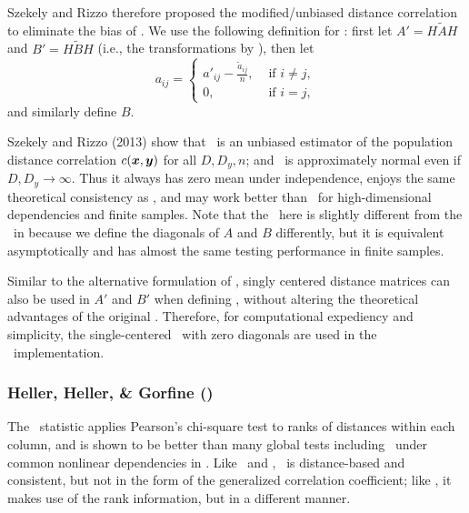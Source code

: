 \documentclass[11pt]{article}
\begin{document}
Szekely and  Rizzo \cite{SzekelyRizzo2013a, SzekelyRizzo2014, RizzoSzekely2016} therefore proposed the modified/unbiased distance correlation  to eliminate the bias of  \Dcorr. We use the following definition for \Mcorr: first let $A'=H\tilde{A}H$ and $B'=H\tilde{B}H$ (i.e., the transformations by  \Dcorr), then let 
\[a_{ij} = \left\{
  \begin{array}{lr}
    a'_{ij}-\frac{\tilde{a}_{ij}}{n}, & \mbox{ if } i \neq j, \\
    0, &\mbox{ if } i = j,
  \end{array}
\right.
\]
and similarly define $B$. 

Szekely and Rizzo (2013) \cite{SzekelyRizzo2013a} show that 
\Mcorr~is an unbiased estimator of the population distance correlation $c(\boldsymbol{x},\boldsymbol{y})$ for all $D, D_y, n$; and \Mcorr~is approximately normal even if $D,D_y \rightarrow \infty$. Thus it always has zero mean under independence, enjoys the same theoretical consistency as \Dcorr, and may work better than \Dcorr~for high-dimensional dependencies and finite samples. Note that the \Mcorr~here is slightly different from the \Mcorr~in \cite{SzekelyRizzo2013a} because we define the diagonals of $A$ and $B$ differently, but it is equivalent asymptotically and has almost the same testing performance in finite samples.

Similar to the alternative formulation of \Dcorr, singly centered distance matrices can also be used in $A'$ and $B'$ when defining \Mcorr, without altering the theoretical advantages of the original \Mcorr.  
Therefore, for computational expediency and simplicity, the single-centered \Mcorr~with zero diagonals are used in the \Mgc~implementation.

\subsubsection{Heller, Heller, \& Gorfine (\Hhg)}
\label{appen:hhg}

The \Hhg~statistic applies Pearson's chi-square test to ranks of distances within each column, and is shown to be better than many global tests including \Dcorr~under common nonlinear dependencies in \cite{GorfineHellerHeller2012, HellerGorfine2013}. Like \Dcorr~and \Mcorr, \Hhg~is distance-based and consistent, but not in the form of the generalized correlation coefficient; 
like \Mgc, it makes use of the rank information, but in a different manner.
\end{document}
